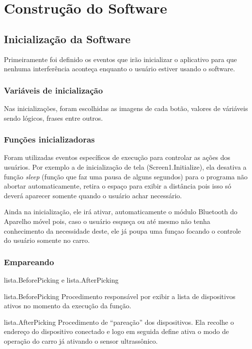 \documentclass[portugues, brazil, a4paper,12pt]{article}
\begin{document}
\newpage
\section{Construção do Software}


\subsection{Inicialização da Software}
Primeiramente foi definido os eventos que irão inicializar o aplicativo para que nenhuma interferência aconteça enquanto o usuário estiver usando o software.

\subsubsection{Variáveis de inicialização}

Nas inicializações, foram escolhidas as imagens de cada botão, valores de váriáveis sendo lógicos, frases entre outros. 

\subsubsection{Funções inicializadoras}
Foram utilizadas eventos específicos de execução para controlar as ações dos usuários. Por exemplo a de inicialização de tela (Screen1.Initialize), ela desativa a função \textit{sleep} (função que faz uma pausa de alguns segundos) para o programa não abortar automaticamente, retira o espaço para exibir a distância pois isso só deverá aparecer somente quando o usuário achar necessário.

Ainda na inicialização, ele irá ativar, automaticamente o módulo Bluetooth do Aparelho móvel pois, caso o usuário esqueça ou até mesmo não tenha conhecimento da necessidade deste, ele já poupa uma funçao focando o controle do usuário somente no carro.

\subsubsection{Empareando}
lista.BeforePicking e lista.AfterPicking

lista.BeforePicking Procedimento responsável por exibir a lista de dispositivos ativos no momento da execução da função.

lista.AfterPicking Procedimento de ``pareação'' dos dispositivos. Ela recolhe o endereço do dispositivo conectado e logo em seguida define ativa o modo de operação do carro já ativando o sensor ultrassônico.
\end{document}

